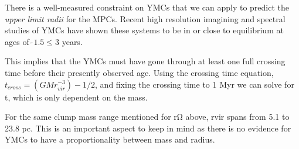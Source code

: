 There is a well-measured constraint on YMCs that we can apply to predict the \textit{upper limit radii} for the MPCs. Recent high resolution imagining and spectral studies of YMCs have shown these systems to be in or close to equilibrium at ages of  $\tilde~ 1.5 \leq 3$ years. \cite{Darwin_1900}

This implies that the YMCs must have gone through at least one full crossing time before their presently observed age. Using the crossing time equation, $t_{cross}=(GMr^{-3}_{vir})−1/2$, and fixing the crossing time to 1 Myr we can solve for t, which is only dependent on the mass. \cite{1999}

For the same clump mass range mentioned for rΩ above, rvir spans from 5.1 to 23.8 pc. This is an important aspect to keep in mind as there is no evidence for YMCs to have a proportionality between mass and radius. \cite{Bedini_2013}